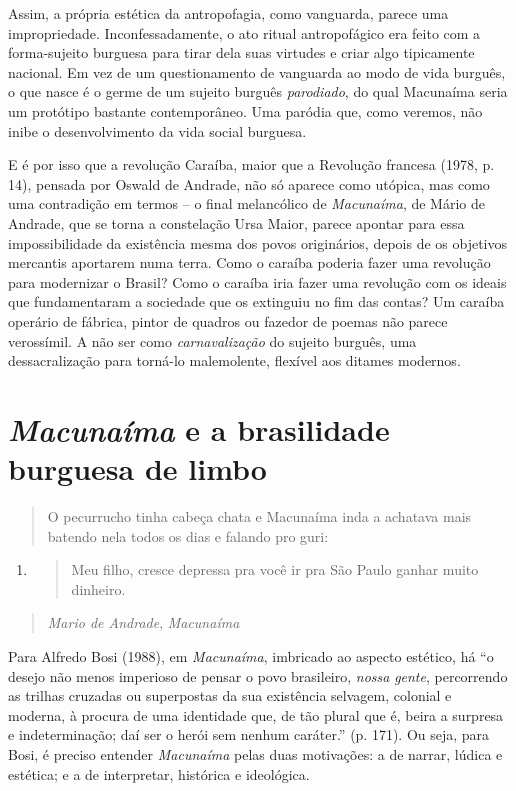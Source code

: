 Assim, a própria estética da antropofagia, como vanguarda, parece uma
impropriedade. Inconfessadamente, o ato ritual antropofágico era feito
com a forma-sujeito burguesa para tirar dela suas virtudes e criar algo
tipicamente nacional. Em vez de um questionamento de vanguarda ao modo
de vida burguês, o que nasce é o germe de um sujeito burguês
\emph{parodiado}, do qual Macunaíma seria um protótipo bastante
contemporâneo. Uma paródia que, como veremos, não inibe o
desenvolvimento da vida social burguesa.

E é por isso que a revolução Caraíba, maior que a Revolução francesa
(1978, p. 14), pensada por Oswald de Andrade, não só aparece como
utópica, mas como uma contradição em termos -- o final melancólico de
\emph{Macunaíma}, de Mário de Andrade, que se torna a constelação Ursa
Maior, parece apontar para essa impossibilidade da existência mesma dos
povos originários, depois de os objetivos mercantis aportarem numa
terra. Como o caraíba poderia fazer uma revolução para modernizar o
Brasil? Como o caraíba iria fazer uma revolução com os ideais que
fundamentaram a sociedade que os extinguiu no fim das contas? Um caraíba
operário de fábrica, pintor de quadros ou fazedor de poemas não parece
verossímil. A não ser como \emph{carnavalização} do sujeito burguês, uma
dessacralização para torná-lo malemolente, flexível aos ditames
modernos.

\section{\emph{Macunaíma} e a brasilidade burguesa de limbo}

\begin{quote}
O pecurrucho tinha cabeça chata e Macunaíma inda a achatava mais batendo
nela todos os dias e falando pro guri:
\end{quote}

\begin{enumerate}
\item
  \begin{quote}
  Meu filho, cresce depressa pra você ir pra São Paulo ganhar muito
  dinheiro.
  \end{quote}
\end{enumerate}

\begin{quote}
\emph{Mario de Andrade}, \emph{Macunaíma}
\end{quote}

Para Alfredo Bosi (1988), em \emph{Macunaíma}, imbricado ao aspecto
estético, há ``o desejo não menos imperioso de pensar o povo brasileiro,
\emph{nossa} \emph{gente}, percorrendo as trilhas cruzadas ou
superpostas da sua existência selvagem, colonial e moderna, à procura de
uma identidade que, de tão plural que é, beira a surpresa e
indeterminação; daí ser o herói sem nenhum caráter.'' (p. 171). Ou seja,
para Bosi, é preciso entender \emph{Macunaíma} pelas duas motivações: a
de narrar, lúdica e estética; e a de interpretar, histórica e
ideológica.

